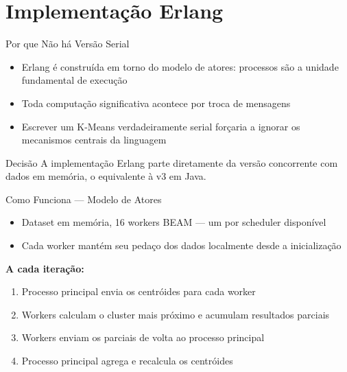 \section{Implementação Erlang}

\begin{frame}{Por que Não há Versão Serial}
    \begin{itemize}
        \item Erlang é construída em torno do modelo de atores: processos são a
              unidade fundamental de execução
        \item Toda computação significativa acontece por troca de mensagens
        \item Escrever um K-Means verdadeiramente serial forçaria a ignorar os
              mecanismos centrais da linguagem
    \end{itemize}

    \vspace{0.5em}
    \begin{block}{Decisão}
        A implementação Erlang parte diretamente da versão concorrente com dados em memória,
        o equivalente à v3 em Java.
    \end{block}
\end{frame}

\begin{frame}{Como Funciona --- Modelo de Atores}
    \begin{itemize}
        \item Dataset em memória, \alert{16 workers} BEAM --- um por scheduler disponível
        \item Cada worker mantém seu pedaço dos dados localmente desde a inicialização
    \end{itemize}

    \vspace{0.5em}
    \textbf{A cada iteração:}
    \begin{enumerate}
        \item Processo principal envia os centróides para cada worker
        \item Workers calculam o cluster mais próximo e acumulam resultados parciais
        \item Workers enviam os parciais de volta ao processo principal
        \item Processo principal agrega e recalcula os centróides
    \end{enumerate}
\end{frame}

